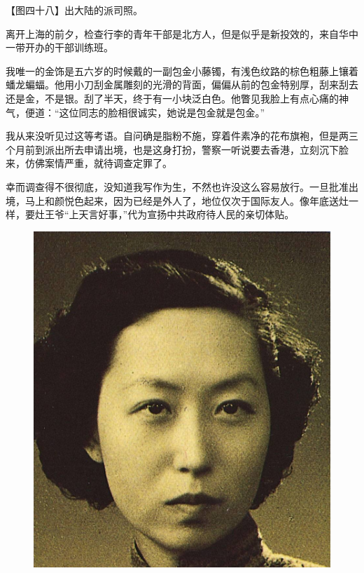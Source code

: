 \clearpage
\par 【图四十八】出大陆的派司照。
\par 离开上海的前夕，检查行李的青年干部是北方人，但是似乎是新投效的，来自华中一带开办的干部训练班。
\par 我唯一的金饰是五六岁的时候戴的一副包金小藤镯，有浅色纹路的棕色粗藤上镶着蟠龙蝙蝠。他用小刀刮金属雕刻的光滑的背面，偏偏从前的包金特别厚，刮来刮去还是金，不是银。刮了半天，终于有一小块泛白色。他瞥见我脸上有点心痛的神气，便道：“这位同志的脸相很诚实，她说是包金就是包金。”
\par 我从来没听见过这等考语。自问确是脂粉不施，穿着件素净的花布旗袍，但是两三个月前到派出所去申请出境，也是这身打扮，警察一听说要去香港，立刻沉下脸来，仿佛案情严重，就待调查定罪了。
\par 幸而调查得不很彻底，没知道我写作为生，不然也许没这么容易放行。一旦批准出境，马上和颜悦色起来，因为已经是外人了，地位仅次于国际友人。像年底送灶一样，要灶王爷“上天言好事，”代为宣扬中共政府待人民的亲切体贴。
\begin{figure}[htb]
    \centering %
    \includegraphics[scale=0.4]{picture/对照记48.jpeg}
\end{figure}


